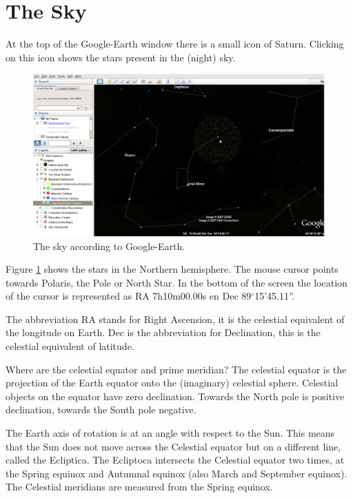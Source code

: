 \documentclass[12pt,a4paper]{article}
\numberwithin{equation}{section}
\numberwithin{figure}{section}
\numberwithin{table}{section}
\begin{document}
\section{The Sky}
At the top of the Google-Earth window there is a small icon of Saturn. Clicking on this icon shows the stars present in the (night) sky.
\begin{figure}\begin{center}
\includegraphics[scale=0.33]{GE_sky.eps}
\caption{The sky according to Google-Earth.}\label{fig:GE_sky}
\end{center}\end{figure}

Figure \ref{fig:GE_sky} shows the stars in the Northern hemisphere. The mouse cursor points towards Polaris, the Pole or North Star. In the bottom of the screen the location of the cursor is represented as RA 7h10m00.00s en Dec 89$^{\circ}$15'45.11''. 

The abbreviation RA stands for Right Ascension, it is the celestial equivalent of the longitude on Earth. Dec is the abbreviation for Declination, this is the celestial equivalent of latitude.

Where are the celestial equator and prime meridian? The celestial equator is the projection of the Earth  equator onto the (imaginary) celestial sphere. Celestial objects on the equator have zero declination. Towards the North pole is positive declination, towards the South pole negative.

The Earth axis of rotation is at an angle with respect to the Sun. This means that the Sun does not move across the Celestial equator but on a different line, called the Ecliptica. The Ecliptoca intersects the Celestial equator two times, at the Spring equinox and Autumnal equinox (also March and September equinox). The Celestial meridians are measured from the Spring equinox.
\end{document}
